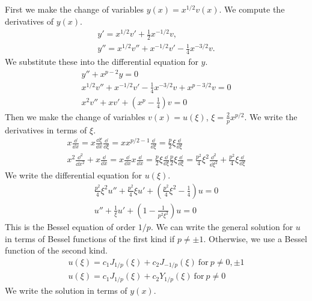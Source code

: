 {%
\begin{Solution}
  First we make the change of variables $y(x) = x^{1/2} v(x)$.
  We compute the derivatives of $y(x)$.
  \begin{gather*}
    y' = x^{1/2} v' + \frac{1}{2} x^{-1/2} v, 
    \\
    y'' = x^{1/2} v'' + x^{-1/2} v' - \frac{1}{4} x^{-3/2} v.
  \end{gather*}
  We substitute these into the differential equation for $y$.
  \begin{gather*}
    y'' + x^{p-2} y = 0 
    \\
    x^{1/2} v'' + x^{-1/2} v' - \frac{1}{4} x^{-3/2} v + x^{p-3/2} v = 0 
    \\
    x^2 v'' + x v' + \left( x^p - \frac{1}{4} \right) v = 0 
  \end{gather*}
  Then we make the change of variables $v(x) = u(\xi)$, 
  $\xi = \frac{2}{p} x^{p/2}$.  We write the derivatives in terms of $\xi$.
  \begin{gather*}
    x \frac{\dd}{\dd x} = x \frac{\dd \xi}{\dd x} \frac{\dd}{\dd \xi}
    = x x^{p/2-1} \frac{\dd}{\dd \xi}
    = \frac{p}{2} \xi \frac{\dd}{\dd \xi} 
    \\
    x^2 \frac{\dd^2}{\dd x^2} + x \frac{\dd}{\dd x} 
    = x \frac{\dd}{\dd x} x \frac{\dd}{\dd x}
    = \frac{p}{2} \xi \frac{\dd}{\dd \xi} \frac{p}{2} \xi \frac{\dd}{\dd \xi}
    = \frac{p^2}{4} \xi^2 \frac{\dd^2}{\dd \xi^2} + \frac{p^2}{4} \xi \frac{\dd}{\dd \xi}
  \end{gather*}
  We write the differential equation for $u(\xi)$.
  \begin{gather*}
    \frac{p^2}{4} \xi^2 u'' + \frac{p^2}{4} \xi u'
    + \left( \frac{p^2}{4} \xi^2 - \frac{1}{4} \right) u = 0
    \\
    u'' + \frac{1}{\xi} u' + \left( 1 - \frac{1}{p^2 \xi^2} \right) u = 0 
  \end{gather*}
  This is the Bessel equation of order $1/p$.  We can write the general 
  solution for $u$ in terms of Bessel functions of the first kind if 
  $p \neq \pm 1$.  Otherwise, we use a Bessel function of the second kind.
  \begin{gather*}
    u(\xi) = c_1 J_{1/p}(\xi) + c_2 J_{-1/p}(\xi)\ \mathrm{for}\ p \neq 0,\pm 1
    \\
    u(\xi) = c_1 J_{1/p}(\xi) + c_2 Y_{1/p}(\xi)\ \mathrm{for}\ p \neq 0
  \end{gather*}
  We write the solution in terms of $y(x)$.
  \begin{gather*}

\end{gather*}
\end{Solution}}
